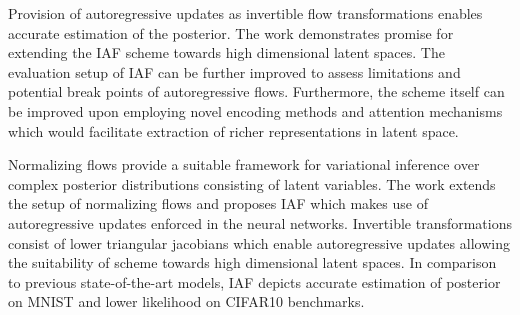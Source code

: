 \documentclass[11pt,letterpaper]{article}
\begin{document}
Provision of autoregressive updates as invertible flow transformations enables accurate estimation of the posterior. The work demonstrates promise for extending the IAF scheme towards high dimensional latent spaces. The evaluation setup of IAF can be further improved to assess limitations and potential break points of autoregressive flows. Furthermore, the scheme itself can be improved upon employing novel encoding methods and attention mechanisms which would facilitate extraction of richer representations in latent space.

Normalizing flows provide a suitable framework for variational inference over complex posterior distributions consisting of latent variables. The work extends the setup of normalizing flows and proposes IAF which makes use of autoregressive updates enforced in the neural networks. Invertible transformations consist of lower triangular jacobians which enable autoregressive updates allowing the suitability of scheme towards high dimensional latent spaces. In comparison to previous state-of-the-art models, IAF depicts accurate estimation of posterior on MNIST and lower likelihood on CIFAR10 benchmarks.
\end{document}
